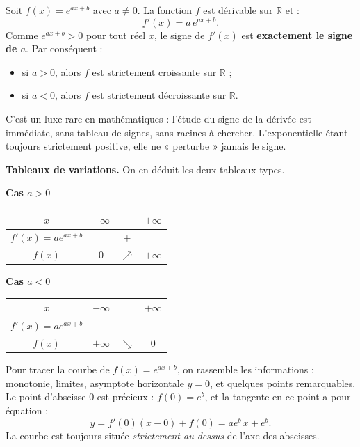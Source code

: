 \documentclass[11pt]{article}
\newcommand{\cle}[1]{{\popxbold\color{popdark}#1}}
\newcounter{popsec}
\newcounter{popsub}
\newcommand{\courssub}[1]{%
  \stepcounter{popsub}%
  \par\vspace{9pt}\noindent{\popxbold\fontsize{11.5}{13}\selectfont\color{popink}{\color{poporange}\thepopsec.\thepopsub}\hspace{6pt}#1}\par\nopagebreak\vspace{4pt}
}
\begin{document}
\begin{propriete}[Dérivée et monotonie de $f(x) = e^{ax+b}$]
Soit $f(x) = e^{ax+b}$ avec $a \neq 0$. La fonction $f$ est dérivable sur $\mathbb{R}$ et :
\[ f'(x) = a\,e^{ax+b}. \]
Comme $e^{ax+b} > 0$ pour tout réel $x$, le signe de $f'(x)$ est \textbf{exactement le signe de $a$}. Par conséquent :
\begin{itemize}
\item si $a > 0$, alors $f$ est \cle{strictement croissante} sur $\mathbb{R}$ ;
\item si $a < 0$, alors $f$ est \cle{strictement décroissante} sur $\mathbb{R}$.
\end{itemize}
\end{propriete}

C'est un luxe rare en mathématiques : l'étude du signe de la dérivée est immédiate, sans tableau de signes, sans racines à chercher. L'exponentielle étant toujours strictement positive, elle ne « perturbe » jamais le signe.

\textbf{Tableaux de variations.} On en déduit les deux tableaux types.

\begin{center}
\textbf{Cas $a > 0$}\qquad
\begin{tabular}{|c|ccc|}
\hline
$x$ & $-\infty$ & & $+\infty$ \\
\hline
$f'(x) = a e^{ax+b}$ & & $+$ & \\
\hline
$f(x)$ & $0$ & $\nearrow$ & $+\infty$ \\
\hline
\end{tabular}
\qquad
\textbf{Cas $a < 0$}\qquad
\begin{tabular}{|c|ccc|}
\hline
$x$ & $-\infty$ & & $+\infty$ \\
\hline
$f'(x) = a e^{ax+b}$ & & $-$ & \\
\hline
$f(x)$ & $+\infty$ & $\searrow$ & $0$ \\
\hline
\end{tabular}
\end{center}

\courssub{Tracé de la courbe}

Pour tracer la courbe de $f(x) = e^{ax+b}$, on rassemble les informations : monotonie, limites, asymptote horizontale $y = 0$, et quelques points remarquables. Le point d'abscisse $0$ est précieux : $f(0) = e^b$, et la tangente en ce point a pour équation :
\[ y = f'(0)(x-0) + f(0) = a e^b\, x + e^b. \]
La courbe est toujours située \emph{strictement au-dessus} de l'axe des abscisses.
\end{document}
